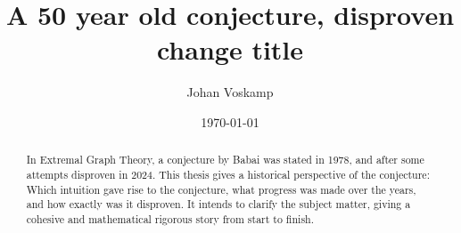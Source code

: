 \documentclass[a4paper,10pt]{article}
\title{A 50 year old conjecture, disproven \textbf{change title}}
\author{Johan Voskamp}
\date{\today}
\begin{document}
\maketitle

\begin{abstract}
    In Extremal Graph Theory, a conjecture by Babai was stated in 1978, and after some attempts disproven in 2024. This thesis gives a historical perspective of the conjecture: Which intuition gave rise to the conjecture, what progress was made over the years, and how exactly was it disproven. It intends to clarify the subject matter, giving a cohesive
    and mathematical rigorous story from start to finish.
\end{abstract}
\end{document}
